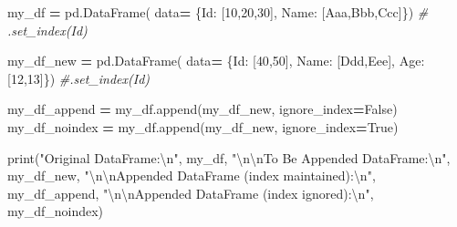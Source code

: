 \documentclass[
]{book}
\newenvironment{Shaded}{\begin{snugshade}}{\end{snugshade}}
\newcommand{\BuiltInTok}[1]{#1}
\newcommand{\CharTok}[1]{\textcolor[rgb]{0.5,0.5,0.5}{#1}}
\newcommand{\CommentTok}[1]{\textcolor[rgb]{0.37,0.37,0.37}{\textit{#1}}}
\newcommand{\DecValTok}[1]{\textcolor[rgb]{0.06,0.06,0.06}{#1}}
\newcommand{\NormalTok}[1]{#1}
\newcommand{\OperatorTok}[1]{\textcolor[rgb]{0.43,0.43,0.43}{\textbf{#1}}}
\newcommand{\StringTok}[1]{\textcolor[rgb]{0.5,0.5,0.5}{#1}}
\newcommand{\VariableTok}[1]{\textcolor[rgb]{0,0,0}{#1}}
\begin{document}
\begin{Shaded}
\begin{Highlighting}[]
\NormalTok{my\_df }\OperatorTok{=}\NormalTok{ pd.DataFrame(}
\NormalTok{          data}\OperatorTok{=}\NormalTok{ \{}\StringTok{\textquotesingle{}Id\textquotesingle{}}\NormalTok{:   [}\DecValTok{10}\NormalTok{,}\DecValTok{20}\NormalTok{,}\DecValTok{30}\NormalTok{],}
                 \StringTok{\textquotesingle{}Name\textquotesingle{}}\NormalTok{: [}\StringTok{\textquotesingle{}Aaa\textquotesingle{}}\NormalTok{,}\StringTok{\textquotesingle{}Bbb\textquotesingle{}}\NormalTok{,}\StringTok{\textquotesingle{}Ccc\textquotesingle{}}\NormalTok{]\})}
\CommentTok{\#                 .set\_index(\textquotesingle{}Id\textquotesingle{})}
                 
\NormalTok{my\_df\_new }\OperatorTok{=}\NormalTok{ pd.DataFrame(}
\NormalTok{            data}\OperatorTok{=}\NormalTok{ \{}\StringTok{\textquotesingle{}Id\textquotesingle{}}\NormalTok{:   [}\DecValTok{40}\NormalTok{,}\DecValTok{50}\NormalTok{],}
                   \StringTok{\textquotesingle{}Name\textquotesingle{}}\NormalTok{: [}\StringTok{\textquotesingle{}Ddd\textquotesingle{}}\NormalTok{,}\StringTok{\textquotesingle{}Eee\textquotesingle{}}\NormalTok{],}
                   \StringTok{\textquotesingle{}Age\textquotesingle{}}\NormalTok{:  [}\DecValTok{12}\NormalTok{,}\DecValTok{13}\NormalTok{]\})  }
                   \CommentTok{\#.set\_index(\textquotesingle{}Id\textquotesingle{})}
                   
\NormalTok{my\_df\_append  }\OperatorTok{=}\NormalTok{ my\_df.append(my\_df\_new, ignore\_index}\OperatorTok{=}\VariableTok{False}\NormalTok{)}
\NormalTok{my\_df\_noindex }\OperatorTok{=}\NormalTok{ my\_df.append(my\_df\_new, ignore\_index}\OperatorTok{=}\VariableTok{True}\NormalTok{)}

\BuiltInTok{print}\NormalTok{(}\StringTok{"Original DataFrame:}\CharTok{\textbackslash{}n}\StringTok{"}\NormalTok{, my\_df,}
      \StringTok{"}\CharTok{\textbackslash{}n\textbackslash{}n}\StringTok{To Be Appended DataFrame:}\CharTok{\textbackslash{}n}\StringTok{"}\NormalTok{, my\_df\_new,}
      \StringTok{"}\CharTok{\textbackslash{}n\textbackslash{}n}\StringTok{Appended DataFrame (index maintained):}\CharTok{\textbackslash{}n}\StringTok{"}\NormalTok{, my\_df\_append,}
      \StringTok{"}\CharTok{\textbackslash{}n\textbackslash{}n}\StringTok{Appended DataFrame (index ignored):}\CharTok{\textbackslash{}n}\StringTok{"}\NormalTok{, my\_df\_noindex)}
\end{Highlighting}
\end{Shaded}
\end{document}
